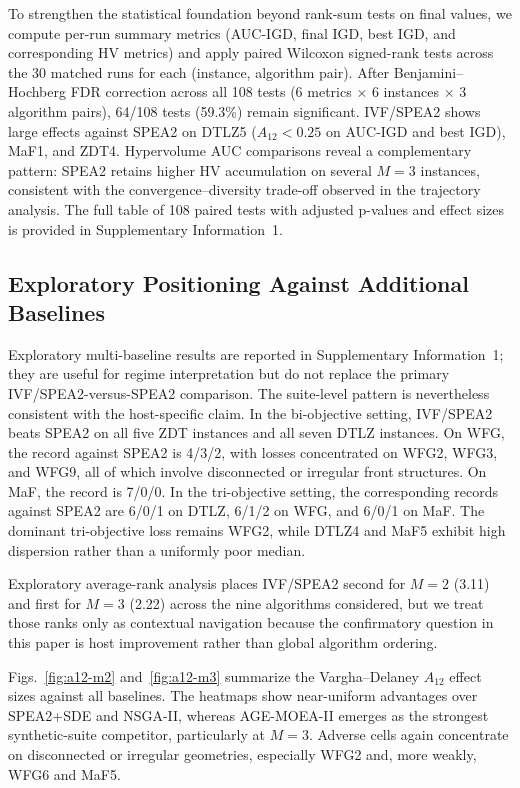 \documentclass[pdflatex,sn-mathphys-ay]{sn-jnl}%
\theoremstyle{thmstyleone}%
\theoremstyle{thmstyletwo}%
\theoremstyle{thmstylethree}%
\begin{document}
To strengthen the statistical foundation beyond rank-sum tests on final values, we compute per-run summary metrics (AUC-IGD, final IGD, best IGD, and corresponding HV metrics) and apply paired Wilcoxon signed-rank tests across the 30 matched runs for each (instance, algorithm pair). After Benjamini--Hochberg FDR correction across all 108 tests (6 metrics $\times$ 6 instances $\times$ 3 algorithm pairs), 64/108 tests (59.3\%) remain significant. IVF/SPEA2 shows large effects against SPEA2 on DTLZ5 ($A_{12} < 0.25$ on AUC-IGD and best IGD), MaF1, and ZDT4. Hypervolume AUC comparisons reveal a complementary pattern: SPEA2 retains higher HV accumulation on several $M{=}3$ instances, consistent with the convergence--diversity trade-off observed in the trajectory analysis. The full table of 108 paired tests with adjusted p-values and effect sizes is provided in Supplementary Information~1.

\subsection{Exploratory Positioning Against Additional Baselines}\label{subsec:results-detailed}
Exploratory multi-baseline results are reported in Supplementary Information~1; they are useful for regime interpretation but do not replace the primary IVF/SPEA2-versus-SPEA2 comparison. The suite-level pattern is nevertheless consistent with the host-specific claim. In the bi-objective setting, IVF/SPEA2 beats SPEA2 on all five ZDT instances and all seven DTLZ instances. On WFG, the record against SPEA2 is 4/3/2, with losses concentrated on WFG2, WFG3, and WFG9, all of which involve disconnected or irregular front structures. On MaF, the record is 7/0/0. In the tri-objective setting, the corresponding records against SPEA2 are 6/0/1 on DTLZ, 6/1/2 on WFG, and 6/0/1 on MaF. The dominant tri-objective loss remains WFG2, while DTLZ4 and MaF5 exhibit high dispersion rather than a uniformly poor median.

Exploratory average-rank analysis places IVF/SPEA2 second for $M=2$ (3.11) and first for $M=3$ (2.22) across the nine algorithms considered, but we treat those ranks only as contextual navigation because the confirmatory question in this paper is host improvement rather than global algorithm ordering.

Figs.~\ref{fig:a12-m2} and~\ref{fig:a12-m3} summarize the Vargha--Delaney $A_{12}$ effect sizes against all baselines. The heatmaps show near-uniform advantages over SPEA2+SDE and NSGA-II, whereas AGE-MOEA-II emerges as the strongest synthetic-suite competitor, particularly at $M=3$. Adverse cells again concentrate on disconnected or irregular geometries, especially WFG2 and, more weakly, WFG6 and MaF5.
\end{document}
